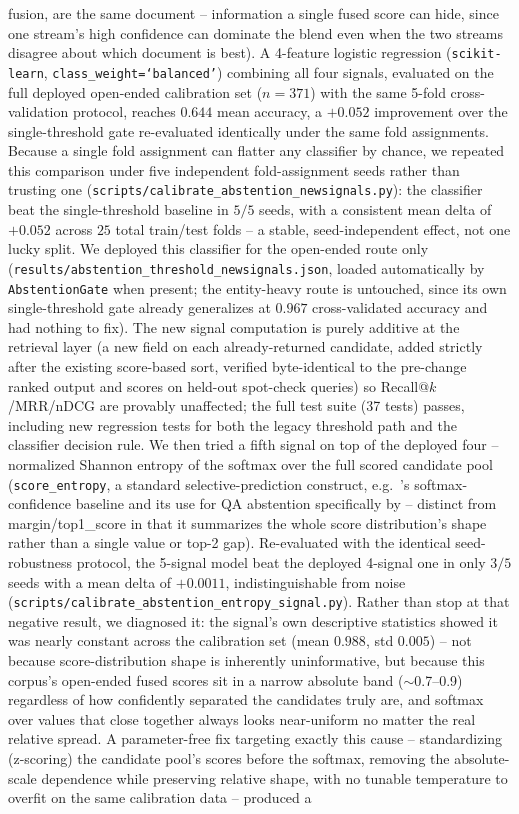 \documentclass[a4paper,twoside]{article}
\begin{document}
fusion, are the same document -- information a single fused score can hide, since one stream's high confidence can dominate the blend even when the two streams disagree about which document is best). A 4-feature logistic regression (\texttt{scikit-learn}, \texttt{class\_weight=`balanced'}) combining all four signals, evaluated on the full deployed open-ended calibration set ($n=371$) with the same 5-fold cross-validation protocol, reaches $0.644$ mean accuracy, a $+0.052$ improvement over the single-threshold gate re-evaluated identically under the same fold assignments. Because a single fold assignment can flatter any classifier by chance, we repeated this comparison under five independent fold-assignment seeds rather than trusting one (\texttt{scripts/calibrate\_abstention\_newsignals.py}): the classifier beat the single-threshold baseline in $5/5$ seeds, with a consistent mean delta of $+0.052$ across $25$ total train/test folds -- a stable, seed-independent effect, not one lucky split. We deployed this classifier for the open-ended route only (\texttt{results/abstention\_threshold\_newsignals.json}, loaded automatically by \texttt{AbstentionGate} when present; the entity-heavy route is untouched, since its own single-threshold gate already generalizes at $0.967$ cross-validated accuracy and had nothing to fix). The new signal computation is purely additive at the retrieval layer (a new field on each already-returned candidate, added strictly after the existing score-based sort, verified byte-identical to the pre-change ranked output and scores on held-out spot-check queries) so Recall@$k$/MRR/nDCG are provably unaffected; the full test suite (37 tests) passes, including new regression tests for both the legacy threshold path and the classifier decision rule. We then tried a fifth signal on top of the deployed four -- normalized Shannon entropy of the softmax over the full scored candidate pool (\texttt{score\_entropy}, a standard selective-prediction construct, e.g.\ \citet{hendrycks2017baseline}'s softmax-confidence baseline and its use for QA abstention specifically by \citet{kamath2020selective} -- distinct from margin/top1\_score in that it summarizes the whole score distribution's shape rather than a single value or top-2 gap). Re-evaluated with the identical seed-robustness protocol, the 5-signal model beat the deployed 4-signal one in only $3/5$ seeds with a mean delta of $+0.0011$, indistinguishable from noise (\texttt{scripts/calibrate\_abstention\_entropy\_signal.py}). Rather than stop at that negative result, we diagnosed it: the signal's own descriptive statistics showed it was nearly constant across the calibration set (mean $0.988$, std $0.005$) -- not because score-distribution shape is inherently uninformative, but because this corpus's open-ended fused scores sit in a narrow absolute band ($\sim$0.7--0.9) regardless of how confidently separated the candidates truly are, and softmax over values that close together always looks near-uniform no matter the real relative spread. A parameter-free fix targeting exactly this cause -- standardizing (z-scoring) the candidate pool's scores before the softmax, removing the absolute-scale dependence while preserving relative shape, with no tunable temperature to overfit on the same calibration data -- produced a 
\end{document}
